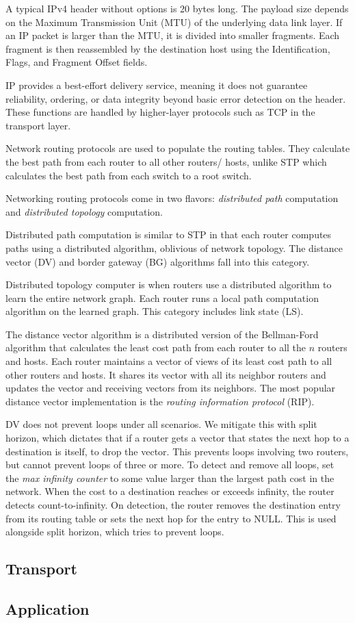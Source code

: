 A typical IPv4 header without options is 20 bytes long.
The payload size depends on the Maximum Transmission Unit
(MTU) of the underlying data link layer. If an IP packet
is larger than the MTU, it is divided into smaller fragments.
Each fragment is then reassembled by the destination host
using the Identification, Flags, and Fragment Offset fields.

IP provides a best-effort delivery service, meaning it does
not guarantee reliability, ordering, or data integrity beyond
basic error detection on the header. These functions are
handled by higher-layer protocols such as TCP in the transport layer.

Network routing protocols are used to populate the routing tables.
They calculate the best path from each router to all other routers/
hosts, unlike STP which calculates the best path from each switch
to a root switch.

Networking routing protocols come in two flavors: \emph{distributed path}
computation and \emph{distributed topology} computation.

Distributed path computation is similar to STP in that each router computes paths
using a distributed algorithm, oblivious of network topology. The distance vector (DV)
and border gateway (BG) algorithms fall into this category.

Distributed topology computer is when routers use a distributed algorithm to learn the
entire network graph. Each router runs a local path computation algorithm on the learned
graph. This category includes link state (LS).

The distance vector algorithm is a distributed version of the Bellman-Ford algorithm that
calculates the least cost path from each router to all the $n$ routers and hosts.
Each router maintains a vector of views of its least cost path to all other routers and
hosts. It shares its vector with all its neighbor routers and updates the vector and
receiving vectors from its neighbors.
The most popular distance vector implementation is the \emph{routing information protocol}
(RIP).

DV does not prevent loops under all scenarios. We mitigate this with
split horizon, which dictates that if a router gets a vector that states
the next hop to a destination is itself, to drop the vector. This prevents
loops involving two routers, but cannot prevent loops of three or more.
To detect and remove all loops, set the \emph{max infinity counter} to
some value larger than the largest path cost in the network. When the cost
to a destination reaches or exceeds infinity, the router detects count-to-infinity.
On detection, the router removes the destination entry from its routing
table or sets the next hop for the entry to NULL. This is used alongside
split horizon, which tries to prevent loops.

\subsection{Transport}

\subsection{Application}


